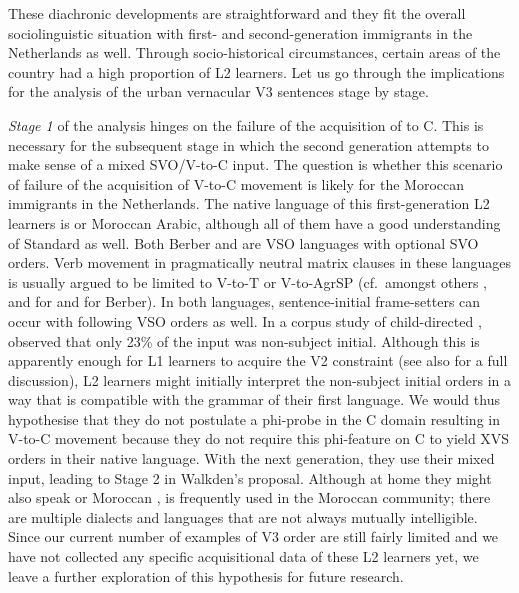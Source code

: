 \documentclass[output=paper]{langsci/langscibook}
\begin{document}
\noindent These diachronic developments are straightforward and they fit the
overall sociolinguistic situation with first- and second-generation immigrants
in the Netherlands as well. Through socio-historical circumstances, certain
areas of the country had a high proportion of L2 learners. Let us go through
the implications for the analysis of the  urban vernacular V3 sentences
stage by stage.

\textit{Stage 1} of the analysis hinges on the failure of the acquisition of
 to C. This is necessary for the subsequent stage in which the
second generation attempts to make sense of a mixed SVO/V-to-C input. The
question is whether this scenario of failure of the acquisition of V-to-C
movement is likely for the Moroccan immigrants in the Netherlands. The native
language of this first-generation L2 learners is  or Moroccan Arabic,
although all of them have a good understanding of Standard  as well. Both
Berber and  are VSO languages with optional SVO orders. Verb movement in
pragmatically neutral matrix clauses in these languages is usually argued to be
limited to V-to-T or V-to-AgrSP (cf.\ amongst others \citet{Benmamoun:1992a},
\citet{Jouini:2014} and \citet{Shlonsky:2000} for  and \citet{Choe:1987}
for Berber). In both languages, sentence-initial frame-setters can occur with
following VSO orders as well. In a corpus study of child-directed ,
\citet{MacWhinneySnow:1985} observed that only 23\% of the input was
non-subject initial. Although this is apparently enough for  L1 learners
to acquire the V2 constraint (see also \citet[114]{Yang:2000} for a full
discussion), L2 learners might initially interpret the non-subject initial
orders in a way that is compatible with the grammar of their first language. We
would thus hypothesise that they do not postulate a phi-probe in the C domain
resulting in V-to-C movement because they do not require this phi-feature on C
to yield XVS orders in their native language. With the next generation, they
use their mixed input, leading to Stage 2 in Walkden's proposal. Although at
home they might also speak  or Moroccan , 
is frequently used in the Moroccan community; there are multiple dialects and
languages that are not always mutually intelligible. Since our current number
of examples of V3 order are still fairly limited and we have
not collected any specific acquisitional data of these L2 learners yet, we
leave a further exploration of this hypothesis for future research.
\end{document}
